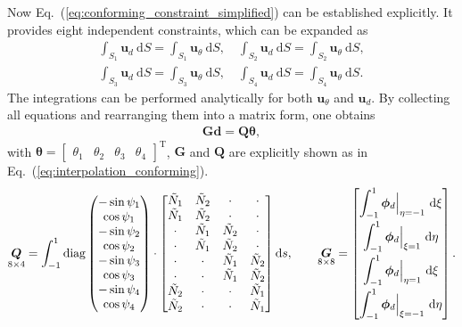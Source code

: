 \documentclass[3p,sort&compress,review,11pt]{elsarticle}
\newcommand*{\md}[1]{\mathrm{d}#1}
\newcommand*{\mT}{\mathrm{T}}
\newcommand*{\eqsref}[1]{Eq.~(\ref{#1})}
\newcommand*{\mb}{\bm}
\begin{document}
Now \eqsref{eq:conforming_constraint_simplified} can be established explicitly. It provides eight independent constraints, which can be expanded as
\begin{gather*}
\int_{S_1}\mb{u}_d~\md{S}=\int_{S_1}\mb{u}_\theta~\md{S},\quad
\int_{S_2}\mb{u}_d~\md{S}=\int_{S_2}\mb{u}_\theta~\md{S},\\
\int_{S_3}\mb{u}_d~\md{S}=\int_{S_3}\mb{u}_\theta~\md{S},\quad
\int_{S_4}\mb{u}_d~\md{S}=\int_{S_4}\mb{u}_\theta~\md{S}.
\end{gather*}
The integrations can be performed analytically for both $\mb{u}_\theta$ and $\mb{u}_d$. By collecting all equations and rearranging them into a matrix form, one obtains
\begin{gather}
\mb{G}\mb{d}=\mb{Q}\mb{\theta},
\end{gather}
with $\mb{\theta}=\begin{bmatrix}\theta_1&\theta_2&\theta_3&\theta_4\end{bmatrix}^\mT$, $\mb{G}$ and $\mb{Q}$ are explicitly shown as in \eqsref{eq:interpolation_conforming}.
\begin{gather}\label{eq:interpolation_conforming}
\underset{\numproduct{8x4}}{\mb{Q}}=\int_{-1}^{1}\text{diag}\begin{pmatrix}
-\sin\psi_1\\\cos\psi_1\\-\sin\psi_2\\\cos\psi_2\\-\sin\psi_3\\\cos\psi_3\\-\sin\psi_4\\\cos\psi_4
\end{pmatrix}\cdot\begin{bmatrix}
\tilde{N}_1&\tilde{N}_2&\cdot&\cdot\\
\tilde{N}_1&\tilde{N}_2&\cdot&\cdot\\
\cdot&\tilde{N}_1&\tilde{N}_2&\cdot\\
\cdot&\tilde{N}_1&\tilde{N}_2&\cdot\\
\cdot&\cdot&\tilde{N}_1&\tilde{N}_2\\
\cdot&\cdot&\tilde{N}_1&\tilde{N}_2\\
\tilde{N}_2&\cdot&\cdot&\tilde{N}_1\\
\tilde{N}_2&\cdot&\cdot&\tilde{N}_1\\
\end{bmatrix}\md{s},\qquad
\underset{\numproduct{8x8}}{\mb{G}}=\begin{bmatrix}
\displaystyle\int_{-1}^{1}\mb{\phi}_d\Big|_{\eta=-1}~\md{\xi}\\[3mm]
\displaystyle\int_{-1}^{1}\mb{\phi}_d\Big|_{\xi=1}~\md{\eta}\\[3mm]
\displaystyle\int_{-1}^{1}\mb{\phi}_d\Big|_{\eta=1}~\md{\xi}\\[3mm]
\displaystyle\int_{-1}^{1}\mb{\phi}_d\Big|_{\xi=-1}~\md{\eta}
\end{bmatrix}.
\end{gather}
\end{document}
